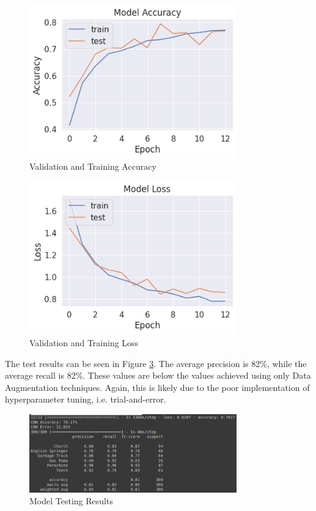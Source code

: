 \begin{figure}[H]
	\centering
	\includegraphics[width=0.8\textwidth]{images/q1/pe/accuracy}
	\caption{Validation and Training Accuracy}
	\label{fig:q1peacc}
\end{figure}


\begin{figure}[H]
	\centering
	\includegraphics[width=0.8\textwidth]{images/q1/pe/loss}
	\caption{Validation and Training Loss}
	\label{fig:q1peloss}
\end{figure}

The test results can be seen in Figure \ref{fig:q1peresults}. The average
precision is 82\%, while the average recall is 82\%. These values are below the
values achieved using only Data Augmentation techniques. Again, this is likely
due to the poor implementation of hyperparameter tuning, i.e. trial-and-error.

\begin{figure}[H]
	\centering
	\includegraphics[width=0.8\textwidth]{images/q1/pe/results}
	\caption{Model Testing Results}
	\label{fig:q1peresults}
\end{figure}

